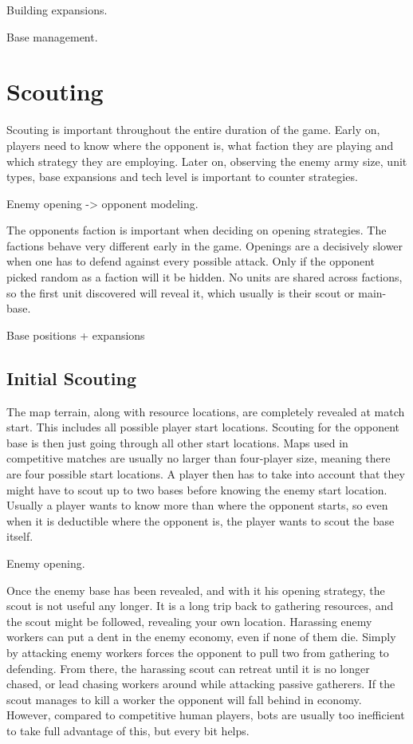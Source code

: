 Building expansions.

Base management.

\section{Scouting}

Scouting is important throughout the entire duration of the game. Early on, players need to know where the opponent is, what faction they are playing and which strategy they are employing. Later on, observing the enemy army size, unit types, base expansions and tech level is important to counter strategies.

Enemy opening -> opponent modeling.

The opponents faction is important when deciding on opening strategies. The factions behave very different early in the game. Openings are a decisively slower when one has to defend against every possible attack. Only if the opponent picked random as a faction will it be hidden. No units are shared across factions, so the first unit discovered will reveal it, which usually is their scout or main-base.

Base positions + expansions


	\subsection{Initial Scouting}

	The map terrain, along with resource locations, are completely revealed at match start. This includes all possible player start locations. Scouting for the opponent base is then just going through all other start locations. Maps used in competitive matches are usually no larger than four-player size, meaning there are four possible start locations. A player then has to take into account that they might have to scout up to two bases before knowing the enemy start location. Usually a player wants to know more than where the opponent starts, so even when it is deductible where the opponent is, the player wants to scout the base itself.
	
	Enemy opening.
	
	Once the enemy base has been revealed, and with it his opening strategy, the scout is not useful any longer. It is a long trip back to gathering resources, and the scout might be followed, revealing your own location. Harassing enemy workers can put a dent in the enemy economy, even if none of them die. Simply by attacking enemy workers forces the opponent to pull two from gathering to defending. From there, the harassing scout can retreat until it is no longer chased, or lead chasing workers around while attacking passive gatherers. If the scout manages to kill a worker the opponent will fall behind in economy. However, compared to competitive human players, bots are usually too inefficient to take full advantage of this, but every bit helps.
	

